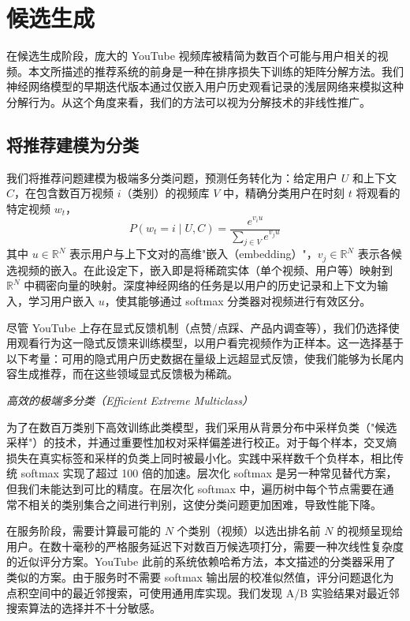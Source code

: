 \section{候选生成}

在候选生成阶段，庞大的 YouTube 视频库被精简为数百个可能与用户相关的视频。本文所描述的推荐系统的前身是一种在排序损失下训练的矩阵分解方法。我们神经网络模型的早期迭代版本通过仅嵌入用户历史观看记录的浅层网络来模拟这种分解行为。从这个角度来看，我们的方法可以视为分解技术的非线性推广。

\subsection{将推荐建模为分类}

我们将推荐问题建模为极端多分类问题，预测任务转化为：给定用户 $U$ 和上下文 $C$，在包含数百万视频 $i$（类别）的视频库 $V$ 中，精确分类用户在时刻 $t$ 将观看的特定视频 $w_t$，
\[
  P(w_t = i \mid U, C) = \frac{e^{v_i u}}{\sum_{j \in V} e^{v_j u}}
\]
其中 $u \in \mathbb{R}^N$ 表示用户与上下文对的高维"嵌入（embedding）"，$v_j \in \mathbb{R}^N$ 表示各候选视频的嵌入。在此设定下，嵌入即是将稀疏实体（单个视频、用户等）映射到 $\mathbb{R}^N$ 中稠密向量的映射。深度神经网络的任务是以用户的历史记录和上下文为输入，学习用户嵌入 $u$，使其能够通过 softmax 分类器对视频进行有效区分。

尽管 YouTube 上存在显式反馈机制（点赞/点踩、产品内调查等），我们仍选择使用观看行为这一隐式反馈来训练模型，以用户看完视频作为正样本。这一选择基于以下考量：可用的隐式用户历史数据在量级上远超显式反馈，使我们能够为长尾内容生成推荐，而在这些领域显式反馈极为稀疏。

\textit{高效的极端多分类（Efficient Extreme Multiclass）}

为了在数百万类别下高效训练此类模型，我们采用从背景分布中采样负类（"候选采样"）的技术，并通过重要性加权对采样偏差进行校正。对于每个样本，交叉熵损失在真实标签和采样的负类上同时被最小化。实践中采样数千个负样本，相比传统 softmax 实现了超过 100 倍的加速。层次化 softmax 是另一种常见替代方案，但我们未能达到可比的精度。在层次化 softmax 中，遍历树中每个节点需要在通常不相关的类别集合之间进行判别，这使分类问题更加困难，导致性能下降。

在服务阶段，需要计算最可能的 $N$ 个类别（视频）以选出排名前 $N$ 的视频呈现给用户。在数十毫秒的严格服务延迟下对数百万候选项打分，需要一种次线性复杂度的近似评分方案。YouTube 此前的系统依赖哈希方法，本文描述的分类器采用了类似的方案。由于服务时不需要 softmax 输出层的校准似然值，评分问题退化为点积空间中的最近邻搜索，可使用通用库实现。我们发现 A/B 实验结果对最近邻搜索算法的选择并不十分敏感。

